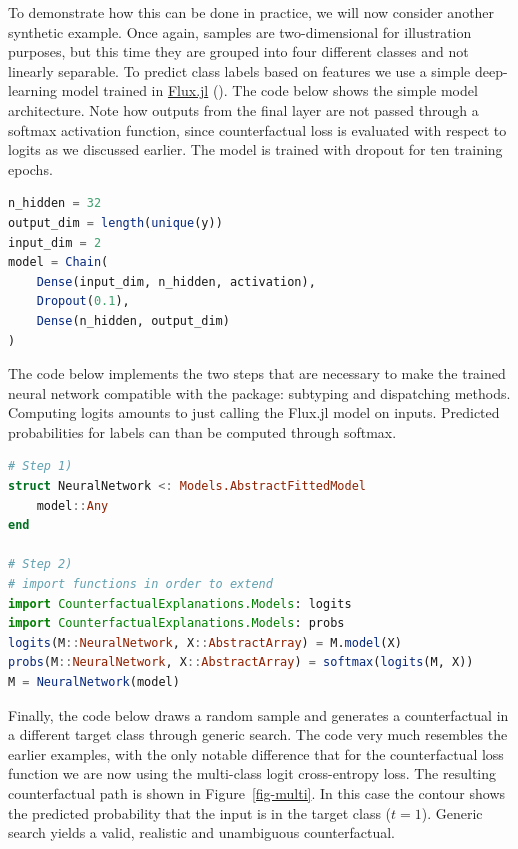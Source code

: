\documentclass{juliacon}
\begin{document}
To demonstrate how this can be done in practice, we will now consider
another synthetic example. Once again, samples are two-dimensional for
illustration purposes, but this time they are grouped into four
different classes and not linearly separable. To predict class labels
based on features we use a simple deep-learning model trained in
\href{https://fluxml.ai/}{Flux.jl} (\cite{innes2018flux}). The code
below shows the simple model architecture. Note how outputs from the
final layer are not passed through a softmax activation function, since
counterfactual loss is evaluated with respect to logits as we discussed
earlier. The model is trained with dropout for ten training epochs.

\begin{lstlisting}[language=Julia, escapechar=@]
n_hidden = 32
output_dim = length(unique(y))
input_dim = 2
model = Chain(
    Dense(input_dim, n_hidden, activation),
    Dropout(0.1),
    Dense(n_hidden, output_dim)
)  
\end{lstlisting}

The code below implements the two steps that are necessary to make the
trained neural network compatible with the package: subtyping and
dispatching methods. Computing logits amounts to just calling the
Flux.jl model on inputs. Predicted probabilities for labels can than be
computed through softmax.

\begin{lstlisting}[language=Julia, escapechar=@]
# Step 1)
struct NeuralNetwork <: Models.AbstractFittedModel
    model::Any
end

# Step 2)
# import functions in order to extend
import CounterfactualExplanations.Models: logits
import CounterfactualExplanations.Models: probs 
logits(M::NeuralNetwork, X::AbstractArray) = M.model(X)
probs(M::NeuralNetwork, X::AbstractArray) = softmax(logits(M, X))
M = NeuralNetwork(model)
\end{lstlisting}

Finally, the code below draws a random sample and generates a
counterfactual in a different target class through generic search. The
code very much resembles the earlier examples, with the only notable
difference that for the counterfactual loss function we are now using
the multi-class logit cross-entropy loss. The resulting counterfactual
path is shown in Figure~\ref{fig-multi}. In this case the contour shows
the predicted probability that the input is in the target class
(\(t=1\)). Generic search yields a valid, realistic and unambiguous
counterfactual.
\end{document}
